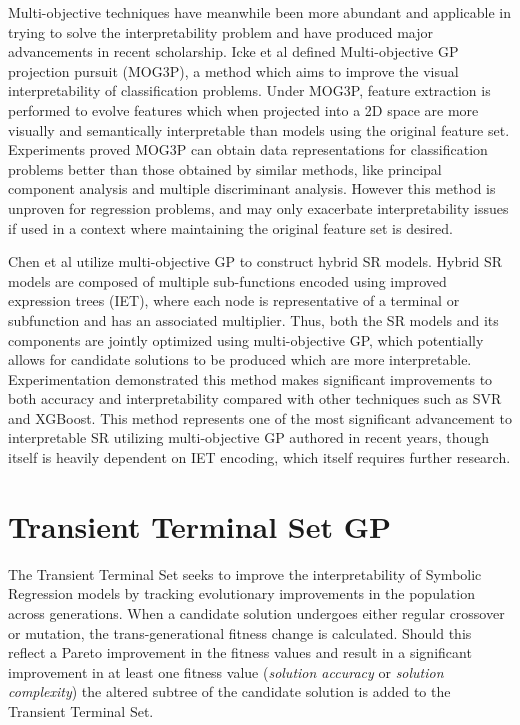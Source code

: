 \documentclass[a4paper, twocolumn]{article}
\begin{document}
Multi-objective techniques have meanwhile been more abundant and applicable in trying to solve the interpretability problem and have produced major advancements in recent scholarship. Icke et al defined Multi-objective GP projection pursuit (MOG3P), a method which aims to improve the visual interpretability of classification problems\cite{3}. Under MOG3P, feature extraction is performed to evolve features which when projected into a 2D space are more visually and semantically interpretable than models using the original feature set. Experiments proved MOG3P can obtain data representations for classification problems better than those obtained by similar methods, like principal component analysis and multiple discriminant analysis. However this method is unproven for regression problems, and may only exacerbate interpretability issues if used in a context where maintaining the original feature set is desired.

Chen et al utilize multi-objective GP to construct hybrid SR models\cite{5}. Hybrid SR models are composed of multiple sub-functions encoded using improved expression trees (IET), where each node is representative of a terminal or subfunction and has an associated multiplier. Thus, both the SR models and its components are jointly optimized using multi-objective GP, which potentially allows for candidate solutions to be produced which are more interpretable. Experimentation demonstrated this method makes significant improvements to both accuracy and interpretability compared with other techniques such as SVR and XGBoost. This method represents one of the most significant advancement to interpretable SR utilizing multi-objective GP authored in recent years, though itself is heavily dependent on IET encoding, which itself requires further research.

\section{Transient Terminal Set GP}
The Transient Terminal Set seeks to improve the interpretability of Symbolic Regression models by tracking evolutionary improvements in the population across generations. When a candidate solution undergoes either regular crossover or mutation, the trans-generational fitness change is calculated. Should this reflect a Pareto improvement in the fitness values and result in a significant improvement in at least one fitness value (\textit{solution accuracy} or \textit{solution complexity}) the altered subtree of the candidate solution is added to the Transient Terminal Set.
\end{document}
